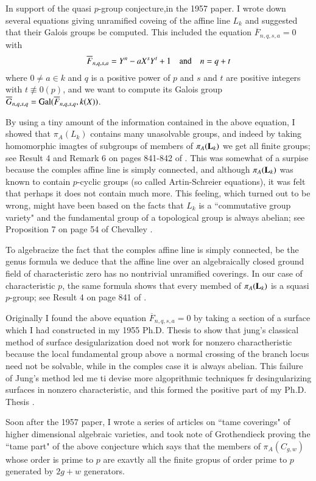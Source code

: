 In support of the quasi $p$-group conjecture,in the 1957 paper. I wrote down several equations giving unramified coveing of the affine line $L_{k}$ and suggested that their Galois groups be computed. This included the equation $\overline{F}_{n,q,s,a}=0$ with
$$
\overline{F}_{n,q,s,a}=Y^{n}-aX^{s}Y^{t} + 1 \quad {\rm and} \quad n=q+t
$$
where $0\neq a \in k$ and $q$ is a positive power of $p$ and $s$ and $t$ are positive integers with $t \nequiv 0(p)$, and we want to compute its Galois group $\overline{G}_{n,q,s,q} = {\rm Gal}(\overline{F}_{n,q,s,q}, k(X))$.

By using a tiny amount of the information contained in the above equation, I showed that $\pi_{A}(L_{k})$ contains many unasolvable groups, and indeed by taking homomorphic imagtes of subgroups of members of $\pi_{A}(\mathbf{L}_{k})$ we get all finite groups; see Result 4 and Remark 6 on pages 841-842 of \cite{art1-key3}. This was somewhat of a surpise because the comples affine line is simply connected, and although $\pi_{A}(\mathbf{L}_{k})$ was known to contain $p$-cyclic groups (so called Artin-Schreier equations), it was felt that perhaps it does not contain much more. This feeling, which turned out to be wrong, might have been based on the facts that $L_{k}$ is a ``commutative group variety" and the fundamental group of a topological group is always abelian; see Proposition 7 on page 54 of Chevalley \cite{art1-key26}.

To algebracize the fact that the comples affine line is simply connected, be the genus formula we deduce that the affine line over an algebraically closed ground field of characteristic zero has no nontrivial unramified coverings. In our case of characteristic $p$, the same formula shows that every membed of $\pi_{A}(\mathbf{L}_{k})$ is a squasi $p$-group; see Result 4 on page 841 of \cite{art1-key3}.

Originally I found the above equation $\overline{F}_{n,q,s,a}=0$ by taking a section of a surface which I had constructed in my 1955 Ph.D. Thesis \cite{art1-key1} to show that jung's classical method \cite{art1-key40} of surface desigularization doed not work for nonzero charactheristic because the local fundamental group above a normal crossing of the branch locus need not be solvable, while in the comples case it is always abelian. This failure of Jung's method led me ti devise more algoprithmic techniques fr desingularizing surfaces in nonzero characteristic, and this formed the positive part of my Ph.D. Thesis \cite{art1-key2}.

Soon after the 1957 paper, I wrote a series of articles \cite{art1-key4} on ``tame coverings" of higher dimensional algebraic varieties, and took note of Grothendieck \cite{art1-key33} proving the ``tame part" of the above conjecture which says that the members of $\pi_{A}(C_{g,w})$ whose order is prime to $p$ are exavtly all the finite gropus of order prime to $p$ generated by $2g+w$ generators.

